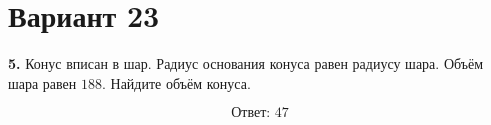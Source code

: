 \documentclass[12pt,a4paper]{article}
\begin{document}
\section*{Вариант 23}

\textbf{5.} Конус вписан в шар. Радиус основания конуса равен радиусу шара.
Объём шара равен \(188\). Найдите объём конуса.

\begin{center}
\end{center}

\[
\boxed{\text{Ответ: }47}
\]
\end{document}
